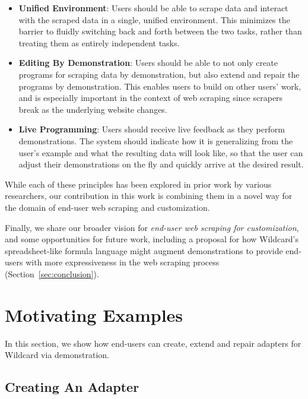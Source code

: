 \documentclass[sigconf,10pt]{acmart}
\providecommand{\tightlist}{%
  \setlength{\itemsep}{0pt}\setlength{\parskip}{0pt}}
\begin{document}
\begin{itemize}
\tightlist
\item
  \textbf{Unified Environment}: Users should be able to scrape data and
  interact with the scraped data in a single, unified environment. This
  minimizes the barrier to fluidly switching back and forth between the
  two tasks, rather than treating them as entirely independent tasks.
\item
  \textbf{Editing By Demonstration}: Users should be able to not only
  create programs for scraping data by demonstration, but also extend
  and repair the programs by demonstration. This enables users to build
  on other users' work, and is especially important in the context of
  web scraping since scrapers break as the underlying website changes.
\item
  \textbf{Live Programming}: Users should receive live feedback as they
  perform demonstrations. The system should indicate how it is
  generalizing from the user's example and what the resulting data will
  look like, so that the user can adjust their demonstrations on the fly
  and quickly arrive at the desired result.
\end{itemize}

While each of these principles has been explored in prior work by
various researchers, our contribution in this work is combining them in
a novel way for the domain of end-user web scraping and customization.

Finally, we share our broader vision for \emph{end-user web scraping for
customization}, and some opportunities for future work, including a
proposal for how Wildcard's spreadsheet-like formula language might
augment demonstrations to provide end-users with more expressiveness in
the web scraping process (Section~\ref{sec:conclusion}).

\hypertarget{sec:demos}{%
\section{Motivating Examples}\label{sec:demos}}

In this section, we show how end-users can create, extend and repair
adapters for Wildcard via demonstration.

\hypertarget{creating-an-adapter}{%
\subsection{Creating An Adapter}\label{creating-an-adapter}}
\end{document}
